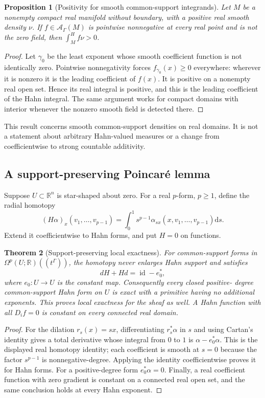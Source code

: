 \documentclass[11pt,letterpaper]{article}
\newtheorem{theorem}{Theorem}[section]
\newtheorem{proposition}[theorem]{Proposition}
\theoremstyle{definition}
\theoremstyle{remark}
\newcommand{\R}{\mathbb R}\newcommand{\C}{\mathbb C}
\newcommand{\A}{\mathscr A}\newcommand{\OO}{\mathcal O}\newcommand{\mm}{\mathfrak m}
\newcommand{\id}{\operatorname{id}}\newcommand{\tr}{\operatorname{tr}}
\newcommand{\dd}{\mathrm d}
\begin{document}
\begin{proposition}[Positivity for smooth common-support integrands]
Let $M$ be a nonempty compact real manifold without boundary, with a positive
real smooth density $\nu$. If $f\in\A_\Gamma(M)$ is pointwise nonnegative
at every real point and is not the zero field, then $\int_M^H f\nu>0$.
\end{proposition}
\begin{proof}
Let $\gamma_0$ be the least exponent whose smooth coefficient function is
not identically zero. Pointwise nonnegativity forces
$f_{\gamma_0}(x)\ge0$ everywhere: wherever it is nonzero it is the leading
coefficient of $f(x)$. It is positive on a nonempty real open set. Hence its
real integral is positive, and this is the leading coefficient of the Hahn
integral. The same argument works for compact domains with interior whenever
the nonzero smooth field is detected there.
\end{proof}

This result concerns smooth common-support densities on real domains. It is
not a statement about arbitrary Hahn-valued measures or a change from
coefficientwise to strong countable additivity.

\subsection{A support-preserving Poincar\'e lemma}

Suppose $U\subset\R^n$ is star-shaped about zero. For a real $p$-form,
$p\ge1$, define the radial homotopy
\[
 (H\alpha)_x(v_1,\ldots,v_{p-1})
 =\int_0^1 s^{p-1}\alpha_{sx}(x,v_1,\ldots,v_{p-1})\dd s.
\]
Extend it coefficientwise to Hahn forms, and put $H=0$ on functions.

\begin{theorem}[Support-preserving local exactness]\label{vtf:thm:poincare}
For common-support forms in $\Omega^p(U;\R)((t^\Gamma))$, the homotopy
never enlarges Hahn support and satisfies
\[
 dH+Hd=\id-e_0^*,
\]
where $e_0:U\to U$ is the constant map. Consequently every closed positive-
degree common-support Hahn form on $U$ is exact with a primitive having
no additional exponents. This proves local exactness for the sheaf as well. A Hahn function with all $D_i f=0$ is constant on every connected
real domain.
\end{theorem}
\begin{proof}
For the dilation $r_s(x)=sx$, differentiating $r_s^*\alpha$ in $s$ and
using Cartan's identity gives a total derivative whose integral from $0$ to
$1$ is $\alpha-e_0^*\alpha$. This is the displayed real homotopy identity;
each coefficient is smooth at $s=0$ because the factor $s^{p-1}$ is
nonnegative-degree. Applying the identity coefficientwise proves it for
Hahn forms. For a positive-degree form $e_0^*\alpha=0$. Finally, a real
coefficient function with zero gradient is constant on a connected real
open set, and the same conclusion holds at every Hahn exponent.
\end{proof}
\end{document}
